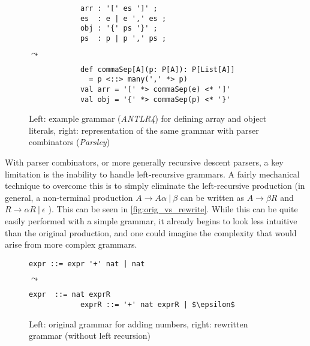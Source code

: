 \begin{figure}[H]
    \centering
    \begin{minipage}{0.33\textwidth}
        \begin{verbatim}
            arr : '[' es ']' ;
            es  : e | e ',' es ;
            obj : '{' ps '}' ;
            ps  : p | p ',' ps ;
        \end{verbatim}
    \end{minipage}
    \hfill
    $\leadsto$
    \hfill
    \begin{minipage}{0.56\textwidth}
        \begin{verbatim}
            def commaSep[A](p: P[A]): P[List[A]]
              = p <::> many(',' *> p)
            val arr = '[' *> commaSep(e) <* ']'
            val obj = '{' *> commaSep(p) <* '}'
        \end{verbatim}
    \end{minipage}
    \caption{Left: example grammar (\textit{ANTLR4}) for defining array and object literals, right: representation of the same grammar with parser combinators (\textit{Parsley})}
    \label{fig:gen_vs_comb}
\end{figure}

With parser combinators, or more generally recursive descent parsers, a key limitation is the inability to handle left-recursive grammars.
A fairly mechanical technique to overcome this is to simply eliminate the left-recursive production (in general, a non-terminal production $A \to A\alpha\ |\ \beta$ can be written as $A \to \beta R$ and $R \to \alpha R\ |\ \epsilon$ \cite{dragon}).
This can be seen in \autoref{fig:orig_vs_rewrite}.
While this can be quite easily performed with a simple grammar, it already begins to look less intuitive than the original production, and one could imagine the complexity that would arise from more complex grammars.

\begin{figure}[H]
    \centering
    \begin{minipage}{0.375\textwidth}
        \begin{lstlisting}[numbers=none, xleftmargin=0pt]
            expr ::= expr '+' nat | nat
        \end{lstlisting}
    \end{minipage}
    \hfill
    $\leadsto$
    \hfill
    \begin{minipage}{0.375\textwidth}
        \begin{lstlisting}[numbers=none, xleftmargin=0pt]
            expr  ::= nat exprR
            exprR ::= '+' nat exprR | $\epsilon$
        \end{lstlisting}
    \end{minipage}
    \caption{Left: original grammar for adding numbers, right: rewritten grammar (without left recursion)}
    \label{fig:orig_vs_rewrite}
\end{figure}

